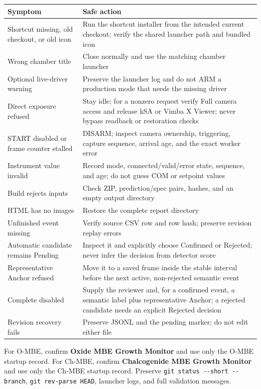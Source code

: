 \documentclass[10pt,a4paper]{article}
\begin{document}
\small
{}
\begin{tabularx}{\linewidth}{L{48mm}Y}
\toprule
\textbf{Symptom} & \textbf{Safe action} \\
\midrule
Shortcut missing, old checkout, or old icon & Run the shortcut installer from the intended current checkout; verify the shared launcher path and bundled icon \\
Wrong chamber title & Close normally and use the matching chamber launcher \\
Optional live-driver warning & Preserve the launcher log and do not ARM a production mode that needs the missing driver \\
Direct exposure refused & Stay idle; for a nonzero request verify Full camera access and release kSA or Vimba X Viewer; never bypass readback or restoration checks \\
START disabled or frame counter stalled & DISARM; inspect camera ownership, triggering, capture sequence, arrival age, and the exact worker error \\
Instrument value invalid & Record mode, connected/valid/error state, sequence, and age; do not guess COM or setpoint values \\
Build rejects inputs & Check ZIP, prediction/spec pairs, hashes, and an empty output directory \\
HTML has no images & Restore the complete report directory \\
Unfinished event missing & Verify source CSV row and row hash; preserve revision replay errors \\
Automatic candidate remains Pending & Inspect it and explicitly choose Confirmed or Rejected; never infer the decision from detector score \\
Representative Anchor refused & Move it to a saved frame inside the stable interval before the next active, non-rejected semantic event \\
Complete disabled & Supply the reviewer and, for a confirmed event, a semantic label plus representative Anchor; a rejected candidate needs an explicit Rejected decision \\
Revision recovery fails & Preserve JSONL and the pending marker; do not edit either file \\
\bottomrule
\end{tabularx}
\normalsize

For O-MBE, confirm \textbf{Oxide MBE Growth Monitor} and use only the O-MBE startup record. For Ch-MBE, confirm \textbf{Chalcogenide MBE Growth Monitor} and use only the Ch-MBE startup record. Preserve \texttt{git status -{}-short -{}-branch}, \texttt{git rev-parse HEAD}, launcher logs, and full validation messages.
\end{document}
